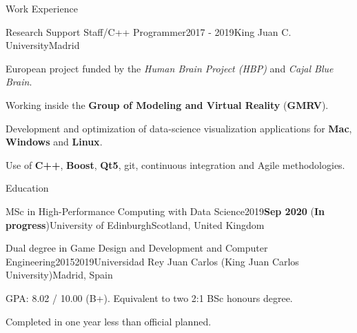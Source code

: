 \documentclass{resume} %
\begin{document}

\begin{mainSection}{Work Experience}

\begin{workExperience}
{Research Support Staff/C++ Programmer}{2017 - 2019}{King Juan C. University}{Madrid}

European project funded by the \textit{Human Brain Project (HBP)} and \textit{Cajal Blue Brain}.

Working inside the {\textbf{Group of Modeling and Virtual Reality}} (\textbf{GMRV}).

Development and optimization of  data-science visualization applications for \textbf{Mac}, \textbf{Windows} and \textbf{Linux}.

Use of \textbf{C++}, \textbf{Boost}, \textbf{Qt5}, git, continuous integration and Agile methodologies.

\end{workExperience}

\end{mainSection}
\begin{mainSection}{Education}

\begin{educationItem}
{MSc in High-Performance Computing with Data Science}{2019}{\textbf{Sep 2020} (\textbf{In progress})}{University of Edinburgh}{Scotland, United Kingdom}
\end{educationItem}

\begin{educationItem}
{Dual degree in Game Design and Development and Computer Engineering}{2015}{2019}{Universidad Rey Juan Carlos (King Juan Carlos University)}{Madrid, Spain}

GPA: 8.02 / 10.00 (B+). Equivalent to two 2:1 BSc honours degree.

Completed in one year less than official planned.
\end{educationItem}

\end{mainSection}

\end{document}

